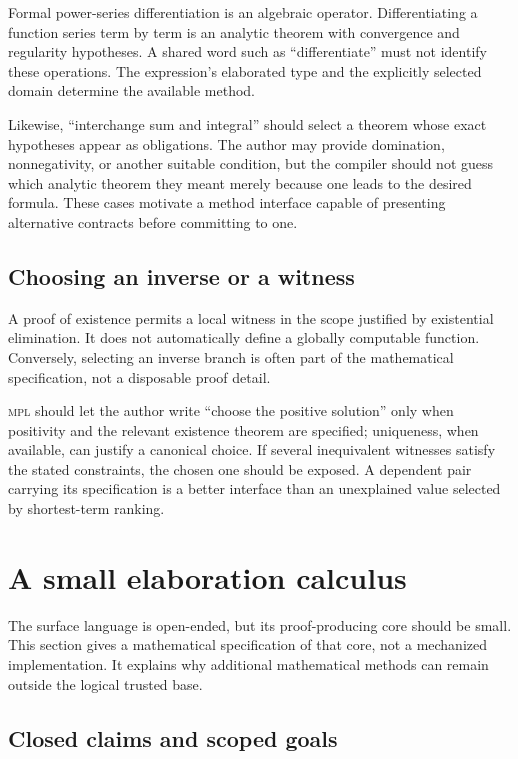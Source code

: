 \documentclass[11pt,a4paper]{article}
\newcommand{\MPL}{\textnormal{\textsc{mpl}}}
\theoremstyle{remark}
\begin{document}
Formal power-series differentiation is an algebraic operator. Differentiating a function series term by term is an analytic theorem with convergence and regularity hypotheses. A shared word such as ``differentiate'' must not identify these operations. The expression's elaborated type and the explicitly selected domain determine the available method.

Likewise, ``interchange sum and integral'' should select a theorem whose exact hypotheses appear as obligations. The author may provide domination, nonnegativity, or another suitable condition, but the compiler should not guess which analytic theorem they meant merely because one leads to the desired formula. These cases motivate a method interface capable of presenting alternative contracts before committing to one.

\subsection{Choosing an inverse or a witness}

A proof of existence permits a local witness in the scope justified by existential elimination. It does not automatically define a globally computable function. Conversely, selecting an inverse branch is often part of the mathematical specification, not a disposable proof detail.

\MPL{} should let the author write ``choose the positive solution'' only when positivity and the relevant existence theorem are specified; uniqueness, when available, can justify a canonical choice. If several inequivalent witnesses satisfy the stated constraints, the chosen one should be exposed. A dependent pair carrying its specification is a better interface than an unexplained value selected by shortest-term ranking.

\section{A small elaboration calculus}
\label{sec:calculus}

The surface language is open-ended, but its proof-producing core should be small. This section gives a mathematical specification of that core, not a mechanized implementation. It explains why additional mathematical methods can remain outside the logical trusted base.

\subsection{Closed claims and scoped goals}
\end{document}
